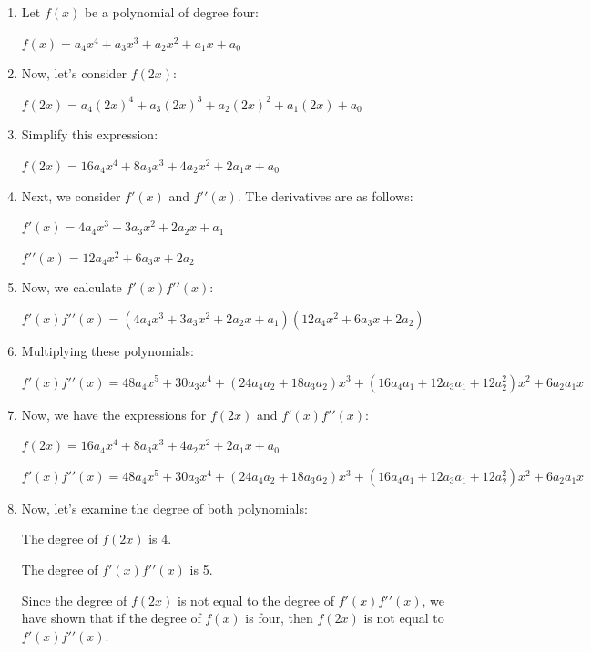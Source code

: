 \documentclass{article}
\begin{document}
\begin{enumerate}
  \item Let $f(x)$ be a polynomial of degree four:

$f(x) = a_4x^4 + a_3x^3 + a_2x^2 + a_1x + a_0$

  \item Now, let's consider $f(2x)$:

$f(2x) = a_4(2x)^4 + a_3(2x)^3 + a_2(2x)^2 + a_1(2x) + a_0$

  \item Simplify this expression:

$f(2x) = 16a_4x^4 + 8a_3x^3 + 4a_2x^2 + 2a_1x + a_0$

  \item Next, we consider $f\prime(x)$ and $f\prime \prime(x)$. The derivatives are as follows:

$f\prime(x) = 4a_4x^3 + 3a_3x^2 + 2a_2x + a_1$

$f\prime \prime(x) = 12a_4x^2 + 6a_3x + 2a_2$

  \item Now, we calculate \(f \prime(x)f\prime \prime(x)\):

$f\prime(x)f\prime \prime(x) = (4a_4x^3 + 3a_3x^2 + 2a_2x + a_1)(12a_4x^2 + 6a_3x + 2a_2)$

  \item Multiplying these polynomials:

$f\prime(x)f\prime \prime(x) = 48a_4x^5 + 30a_3x^4 + (24a_4a_2 + 18a_3a_2)x^3 + (16a_4a_1 + 12a_3a_1 + 12a_2^2)x^2 + 6a_2a_1x$

  \item Now, we have the expressions for $f(2x)$ and $f\prime(x)f\prime \prime(x)$:

$f(2x) = 16a_4x^4 + 8a_3x^3 + 4a_2x^2 + 2a_1x + a_0$

$f\prime(x)f\prime \prime(x) = 48a_4x^5 + 30a_3x^4 + (24a_4a_2 + 18a_3a_2)x^3 + (16a_4a_1 + 12a_3a_1 + 12a_2^2)x^2 + 6a_2a_1x$

  \item Now, let's examine the degree of both polynomials:

The degree of $f(2x)$ is 4.

The degree of $f\prime(x)f\prime \prime(x)$ is 5.

Since the degree of $f(2x)$ is not equal to the degree of $f\prime(x)f\prime \prime(x)$, we have shown that if the degree of $f(x)$ is four, then $f(2x)$ is not equal to $f\prime(x)f\prime \prime(x)$.
\end{enumerate}
\end{document}
